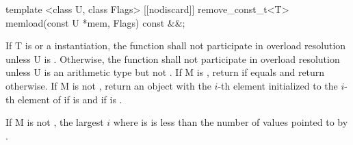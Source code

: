 \begin{itemdecl}
template <class U, class Flags>
[[nodiscard]] remove_const_t<T> memload(const U *mem, Flags) const &&;
\end{itemdecl}
\begin{itemdescr}
  \pnum\remarks If \type T is \bool or a \mask instantiation, the function shall not participate in overload resolution unless \type U is \bool.
  Otherwise, the function shall not participate in overload resolution unless \type U is an arithmetic type but not \bool.
  \pnum\returns If \type M is \bool, return  if  equals \true and return  otherwise.
  If \type M is not \bool, return an object with the $i$-th element initialized to the $i$-th element of  if  is \false and  if  is \true \foralli[M::].

  \pnum\requires If \type M is not \bool, the largest $i$ where  is \true is less than the number of values pointed to by .
\end{itemdescr}

